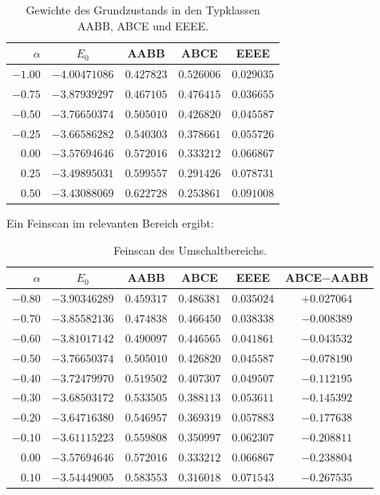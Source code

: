 \documentclass[11pt,a4paper]{article}
\theoremstyle{remark}
\begin{document}
	\begin{table}[h]
		\centering
		\begin{tabular}{rcccc}
			\toprule
			$\alpha$ & $E_0$ & AABB & ABCE & EEEE \\
			\midrule
			$-1.00$ & $-4.00471086$ & $0.427823$ & $0.526006$ & $0.029035$ \\
			$-0.75$ & $-3.87939297$ & $0.467105$ & $0.476415$ & $0.036655$ \\
			$-0.50$ & $-3.76650374$ & $0.505010$ & $0.426820$ & $0.045587$ \\
			$-0.25$ & $-3.66586282$ & $0.540303$ & $0.378661$ & $0.055726$ \\
			$0.00$  & $-3.57694646$ & $0.572016$ & $0.333212$ & $0.066867$ \\
			$0.25$  & $-3.49895031$ & $0.599557$ & $0.291426$ & $0.078731$ \\
			$0.50$  & $-3.43088069$ & $0.622728$ & $0.253861$ & $0.091008$ \\
			\bottomrule
		\end{tabular}
		\caption{Gewichte des Grundzustands in den Typklassen AABB, ABCE und EEEE.}
	\end{table}
	
	Ein Feinscan im relevanten Bereich ergibt:
	
	\begin{table}[h]
		\centering
		\begin{tabular}{rccccc}
			\toprule
			$\alpha$ & $E_0$ & AABB & ABCE & EEEE & ABCE$-$AABB \\
			\midrule
			$-0.80$ & $-3.90346289$ & $0.459317$ & $0.486381$ & $0.035024$ & $+0.027064$ \\
			$-0.70$ & $-3.85582136$ & $0.474838$ & $0.466450$ & $0.038338$ & $-0.008389$ \\
			$-0.60$ & $-3.81017142$ & $0.490097$ & $0.446565$ & $0.041861$ & $-0.043532$ \\
			$-0.50$ & $-3.76650374$ & $0.505010$ & $0.426820$ & $0.045587$ & $-0.078190$ \\
			$-0.40$ & $-3.72479970$ & $0.519502$ & $0.407307$ & $0.049507$ & $-0.112195$ \\
			$-0.30$ & $-3.68503172$ & $0.533505$ & $0.388113$ & $0.053611$ & $-0.145392$ \\
			$-0.20$ & $-3.64716380$ & $0.546957$ & $0.369319$ & $0.057883$ & $-0.177638$ \\
			$-0.10$ & $-3.61115223$ & $0.559808$ & $0.350997$ & $0.062307$ & $-0.208811$ \\
			$0.00$  & $-3.57694646$ & $0.572016$ & $0.333212$ & $0.066867$ & $-0.238804$ \\
			$0.10$  & $-3.54449005$ & $0.583553$ & $0.316018$ & $0.071543$ & $-0.267535$ \\
			\bottomrule
		\end{tabular}
		\caption{Feinscan des Umschaltbereichs.}
	\end{table}
	
\end{document}
